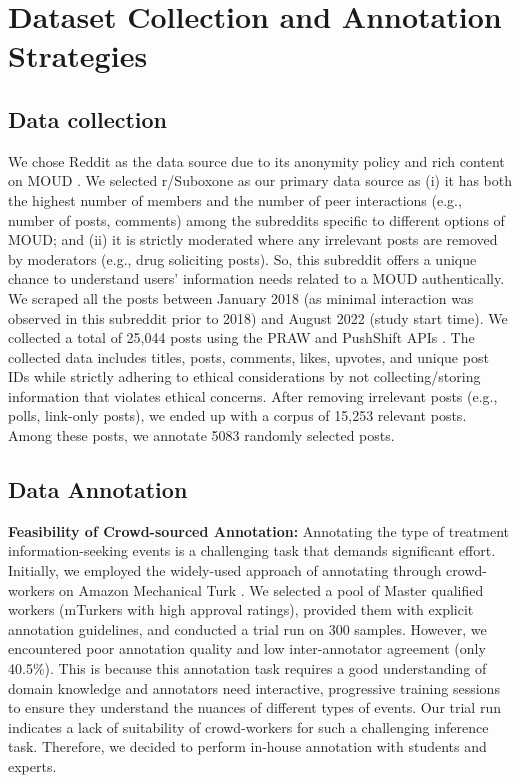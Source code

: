 \documentclass[letterpaper]{article} %
\begin{document}
\section{Dataset Collection and Annotation Strategies}
\subsection{Data collection}
We chose Reddit as the data source due to its anonymity policy and rich content on MOUD \cite{alternative_chi}. We selected r/Suboxone as our primary data source as (i) it has both the highest number of members and the number of peer interactions (e.g., number of posts, comments) among the subreddits specific to different options of MOUD; and (ii) it is strictly moderated where any irrelevant posts are removed by moderators (e.g., drug soliciting posts). So, this subreddit offers a unique chance to understand users' information needs related to a MOUD authentically. We scraped all the posts between January 2018 (as minimal interaction was observed in this subreddit prior to 2018) and August 2022 (study start time). We collected a total of 25,044 posts using the PRAW and PushShift APIs \cite{baumgartner2020pushshift}.  The collected data includes titles, posts, comments, likes, upvotes, and unique post IDs while strictly adhering to ethical considerations by not collecting/storing information that violates ethical concerns. After removing irrelevant posts (e.g., polls, link-only posts), we ended up with a corpus of 15,253 relevant posts. Among these posts, we annotate 5083 randomly selected posts.

\subsection{Data Annotation}

\textbf{Feasibility of Crowd-sourced Annotation:} Annotating the type of treatment information-seeking events is a challenging task that demands significant effort. Initially, we employed the widely-used approach of annotating through crowd-workers on Amazon Mechanical Turk \cite{mirzaei-etal-2023-real}. We selected a pool of Master qualified workers (mTurkers with high approval ratings), provided them with explicit annotation guidelines, and conducted a trial run on 300 samples. However, we encountered poor annotation quality and low inter-annotator agreement (only 40.5\%). This is because this annotation task requires a good understanding of domain knowledge and annotators need interactive, progressive training sessions to ensure they understand the nuances of different types of events. Our trial run indicates a lack of suitability of crowd-workers for such a challenging inference task. Therefore, we decided to perform in-house annotation with students and experts.
\end{document}
